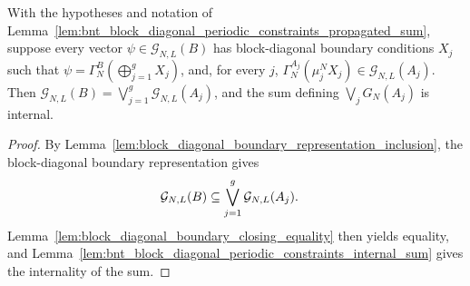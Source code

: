 \begin{lemma}
    \label{lem:bnt_block_diagonal_boundary_representation_equality}
    \leanok
    With the hypotheses and notation of
    Lemma~\ref{lem:bnt_block_diagonal_periodic_constraints_propagated_sum}, suppose
    every vector $\psi\in\mathcal G_{N,L}(B)$ has block-diagonal boundary
    conditions $X_j$ such that
    $\psi = \Gamma_N^B\!\left(\bigoplus_{j=1}^gX_j\right)$,
    and, for every $j$,
    $\Gamma_N^{A_j}(\mu_j^N X_j)\in\mathcal G_{N,L}(A_j)$. Then
    $\mathcal G_{N,L}(B) = \bigvee_{j=1}^g\mathcal G_{N,L}(A_j)$,
    and the sum defining $\bigvee_jG_N(A_j)$ is internal.
\end{lemma}

\begin{proof}
    \leanok
    By Lemma~\ref{lem:block_diagonal_boundary_representation_inclusion}, the
    block-diagonal boundary representation gives
    \begin{align}
        \mathcal G_{N,L}(B)
         & \subseteq
        \bigvee_{j=1}^g\mathcal G_{N,L}(A_j).
        \notag
    \end{align}
    Lemma~\ref{lem:block_diagonal_boundary_closing_equality} then yields
    equality, and
    Lemma~\ref{lem:bnt_block_diagonal_periodic_constraints_internal_sum} gives
    the internality of the sum.
\end{proof}

